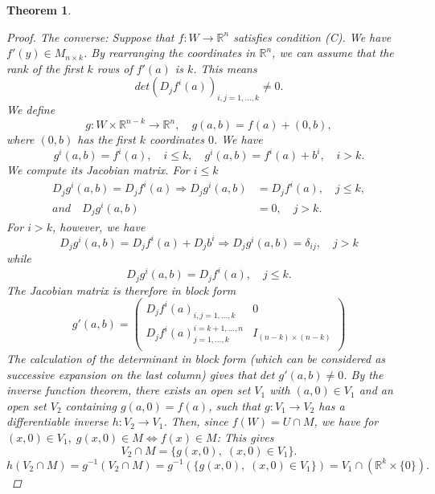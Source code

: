 \documentclass[12pt]{article}
\def\RR{\mathbb{R}}
\newtheorem{theorem}{Theorem}[section]
\begin{document}
\begin{theorem}
\begin{proof}
 \textit{The converse:} Suppose that $f : W \rightarrow \RR^n$ satisfies condition (C). We have $f'(y) \in M_{n\times k}$.
By rearranging the coordinates in $\RR^n$, we can assume that the rank of the first $k$ rows of $f'(a)$ is $k$. This means
\[det (D_jf^i(a))_{i,j=1,\dots ,k} \neq 0.\]
We define
\[g : W \times \RR^{n - k} \rightarrow \RR^n, \quad g(a, b) = f(a) + (0, b),\]
where $(0, b)$ has the first $k$ coordinates $0$. We have
\[g^i(a, b) = f^i(a), \quad i \leq k, \quad g^i(a, b) = f^i(a) + b^i, \quad i > k.\]
We compute its Jacobian matrix. For $i\leq k$
\begin{align*}
D_jg^i(a, b)  = D_jf^i(a) \Rightarrow D_jg^i(a, b) &= D_jf^i(a), \quad j \leq k,\\
and \quad D_jg^i(a, b) & = 0, \quad j > k.
\end{align*}
For $i > k$, however, we have
\[D_jg^i(a, b) = D_jf^i(a) + D_jb^i \Rightarrow D_jg^i(a, b) = \delta _{ij}, \quad j > k\]
while
\[D_jg^i(a, b)  = D_jf^i(a), \quad j \leq k.\]
The Jacobian matrix is therefore in block form
\[
 g'(a,b) =
 \left( \begin{array}{c|c}
 D_jf^i(a)_{i,j = 1,\dots , k}  & 0 \\
\hline
 D_jf^i(a)^{i=k+1 , \dots, n}_{j = 1,\dots , k}  & I_{(n-k)\times (n-k)} \\
 \end{array} \right)
\]
The calculation of the determinant in block form (which can be considered as successive expansion on the last column) gives that $det \;g'(a, b) \neq 0$. By the inverse function theorem, there exists an open set $V_1$ with $(a, 0) \in V_1$ and an open set $V_2$ containing $g(a, 0) = f(a)$, such that $g : V_1 \rightarrow V_2$ has a differentiable inverse $h : V_2 \rightarrow V_1$. Then, since $f(W) = U \cap M$, we have for $(x, 0) \in V_1,\; g(x, 0) \in M \Leftrightarrow f(x) \in M$: This gives
\[V_2 \cap M = \{g(x, 0), \; (x, 0) \in V_1\}.\]
\[h(V_2 \cap M) = g^{-1}(V_2 \cap M) = g^{-1}(\{g(x,  0), \; (x, 0) \in V_1\}) = V_1 \cap (\RR^k\times \{0\}).\]
\end{proof}
\end{theorem}
\end{document}
